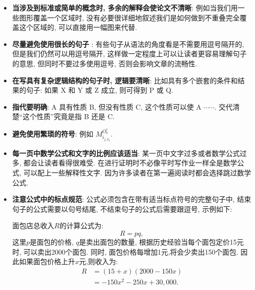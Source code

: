 \documentclass{booki}
\begin{document}
\begin{itemize}
    \item {\textbf{当涉及到标准或简单的概念时, 多余的解释会使论文不清晰}}: 例如当我们用一些图形覆盖一个区域时, 没有必要很详细地叙述我们是如何做到不重叠完全覆盖这个区域的, 可以直接用一幅图来代替{.}
    \item {\textbf{尽量避免使用很长的句子} }: 有些句子从语法的角度看是不需要用逗号隔开的, 但是我们仍然可以用逗号隔开, 这样做一定程度上可以让读者更容易理解句子的意思, 但同时不要过多使用逗号, 否则会影响文章的流畅性{.}
    \item {\textbf{在写具有复杂逻辑结构的句子时, 逻辑要清晰}}:  比如具有多个嵌套的条件和结果的句子: 如果 X 和 Y 或 Z 成立, 则可得到 P 或 Q{.}
    \item {\textbf{指代要明确}}: A 具有性质 B, 但没有性质 C, 这个性质可以使 A $\cdots\cdots$. 交代清楚{``}这个性质''究竟是指 B 还是 C{.}
    \item {\textbf{避免使用繁琐的符号}}: 例如 $M_{i_{j, k_{t}}}^{O_{b}^{c}}${.}
    \item {\textbf{每一页中数学公式和文字的比例应该适当}}: 某一页中文字过多或者数学公式过多, 都会让读者看得很难受. 在进行证明时不必像平时写作业一样全是数学公式, 可以配上一些解释性文字. 因为许多读者在第一遍阅读时都会选择跳过数学公式{.}
    \item {\textbf{注意公式中的标点规范}}: 公式必须包含在带有适当标点符号的完整句子中, 结束句子的公式需要以句号结尾, 不结束句子的公式后需要跟逗号, 示例如下: \par
          面包店总收入$R$的计算公式为:
          \begin{equation*}
              R=pq,
          \end{equation*}
          这里$p$是面包的价格, $q$是卖出面包的数量, 根据历史经验当每个面包定价15元时, 可以卖出2000个面包. 同时, 面包价格每增加1元,将会少卖出150个面包. 因此如果面包价格上升$x$元,则收入为:
          \begin{equation*}
              \begin{split}
                  R&=(15+x)(2000-150x)\\
                  &=-150x^{2}-250x+30,000.
              \end{split}
          \end{equation*}

\end{itemize}
\end{document}
